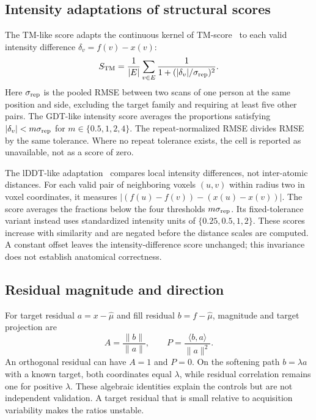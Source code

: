 \subsection{Intensity adaptations of structural scores}
The TM-like score adapts the continuous kernel of TM-score~\cite{tmscore2004} to each valid intensity difference $\delta_v=f(v)-x(v)$:
\begin{equation}
S_{\rm TM}=\frac{1}{|E|}\sum_{v\in E}\frac{1}{1+(|\delta_v|/\sigma_{\rm rep})^2}.
\end{equation}
Here $\sigma_{\rm rep}$ is the pooled RMSE between two scans of one person at the same position and side, excluding the target family and requiring at least five other pairs.
The GDT-like intensity score averages the proportions satisfying $|\delta_v|<m\sigma_{\rm rep}$ for $m\in\{0.5,1,2,4\}$.
The repeat-normalized RMSE divides RMSE by the same tolerance.
Where no repeat tolerance exists, the cell is reported as unavailable, not as a score of zero.

The lDDT-like adaptation~\cite{lddt2013} compares local intensity differences, not inter-atomic distances.
For each valid pair of neighboring voxels $(u,v)$ within radius two in voxel coordinates, it measures
$|(f(u)-f(v))-(x(u)-x(v))|$.
The score averages the fractions below the four thresholds $m\sigma_{\rm rep}$.
Its fixed-tolerance variant instead uses standardized intensity units of $\{0.25, 0.5, 1, 2 \}$.
These scores increase with similarity and are negated before the distance scales are computed.
A constant offset leaves the intensity-difference score unchanged; this invariance does not establish anatomical correctness.

\subsection{Residual magnitude and direction}
For target residual $a=x-\hat\mu$ and fill residual $b=f-\hat\mu$, magnitude and target projection are
\begin{equation}
A=\frac{\|b\|}{\|a\|},\qquad
P=\frac{\langle b,a\rangle}{\|a\|^2}.
\end{equation}
An orthogonal residual can have $A=1$ and $P=0$.
On the softening path $b=\lambda a$ with a known target, both coordinates equal $\lambda$, while residual correlation remains one for positive $\lambda$.
These algebraic identities explain the controls but are not independent validation.
A target residual that is small relative to acquisition variability makes the ratios unstable.

